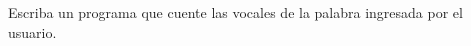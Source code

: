 Escriba un programa que cuente
las vocales de la palabra ingresada por el usuario.

\begin{minipage}[t]{.40\textwidth}
  
\end{minipage}
